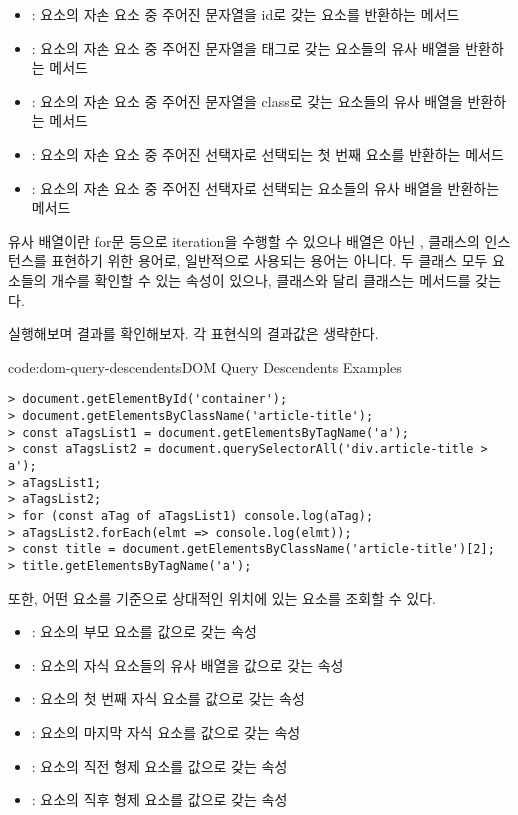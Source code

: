 \begin{itemize}
    \item {}: 요소의 자손 요소 중 주어진 문자열을 id로 갖는 요소를 반환하는 메서드
    \item {}: 요소의 자손 요소 중 주어진 문자열을 태그로 갖는 요소들의 유사 배열을 반환하는 메서드
    \item {}: 요소의 자손 요소 중 주어진 문자열을 class로 갖는 요소들의 유사 배열을 반환하는 메서드
    \item {}: 요소의 자손 요소 중 주어진 선택자로 선택되는 첫 번째 요소를 반환하는 메서드
    \item {}: 요소의 자손 요소 중 주어진 선택자로 선택되는 요소들의 유사 배열을 반환하는 메서드
\end{itemize}

유사 배열이란 for문 등으로 iteration을 수행할 수 있으나 배열은 아닌 ,  클래스의 인스턴스를 표현하기 위한 용어로, 일반적으로 사용되는 용어는 아니다. 두 클래스 모두 요소들의 개수를 확인할 수 있는  속성이 있으나,  클래스와 달리  클래스는  메서드를 갖는다.

\를 실행해보며 결과를 확인해보자. 각 표현식의 결과값은 생략한다.
\newpage

\begin{codeenv}{code:dom-query-descendents}{DOM Query Descendents Examples}\begin{verbatim}
> document.getElementById('container');
> document.getElementsByClassName('article-title');
> const aTagsList1 = document.getElementsByTagName('a');
> const aTagsList2 = document.querySelectorAll('div.article-title > a');
> aTagsList1;
> aTagsList2;
> for (const aTag of aTagsList1) console.log(aTag);
> aTagsList2.forEach(elmt => console.log(elmt));
> const title = document.getElementsByClassName('article-title')[2];
> title.getElementsByTagName('a');
\end{verbatim}
\end{codeenv}

또한, 어떤 요소를 기준으로 상대적인 위치에 있는 요소를 조회할 수 있다.

\begin{itemize}
    \item {}: 요소의 부모 요소를 값으로 갖는 속성
    \item {}: 요소의 자식 요소들의 유사 배열을 값으로 갖는 속성
    \item {}: 요소의 첫 번째 자식 요소를 값으로 갖는 속성
    \item {}: 요소의 마지막 자식 요소를 값으로 갖는 속성
    \item {}: 요소의 직전 형제 요소를 값으로 갖는 속성
    \item {}: 요소의 직후 형제 요소를 값으로 갖는 속성
\end{itemize}

